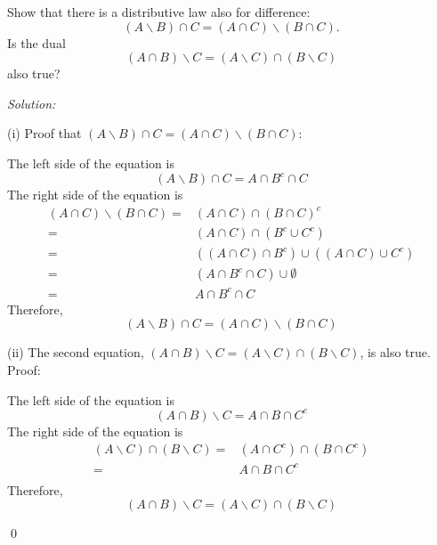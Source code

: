 \documentclass[12pt]{article}
\newenvironment{problem}[2][Problem]{\begin{trivlist}
\item[\hskip \labelsep {\bfseries #1}\hskip \labelsep {\bfseries #2.}]}{\end{trivlist}}
\newenvironment{sol}
    {\emph{Solution:}
    }
    {
    \qed
    }
\begin{document}
\begin{problem}{4}
Show that there is a distributive law also for difference:
$$(A \backslash B) \cap C = (A \cap C) \backslash (B \cap C).$$
Is the dual
$$(A \cap B) \backslash C = (A \backslash C) \cap (B \backslash C)$$
also true?
\end{problem}
\begin{sol}

(i) Proof that $(A \backslash B) \cap C = (A \cap C) \backslash (B \cap C)$:

The left side of the equation is
\[
(A\backslash B)\cap C=A\cap B^c\cap C
\]
The right side of the equation is
\begin{align*}
(A\cap C)\backslash(B\cap C)=&(A\cap C)\cap(B\cap C)^c\\
=&(A\cap C)\cap(B^c\cup C^c)\\
=&((A\cap C)\cap B^c)\cup((A\cap C)\cup C^c)\\
=&(A\cap B^c\cap C)\cup\emptyset\\
=&A\cap B^c\cap C
\end{align*}
Therefore,
\[
(A \backslash B) \cap C = (A \cap C) \backslash (B \cap C)
\]

(ii) The second equation, $(A \cap B) \backslash C = (A \backslash C) \cap (B \backslash C)$, is also true. Proof:

The left side of the equation is
\[
(A\cap B)\backslash C=A\cap B\cap C^c
\]
The right side of the equation is
\begin{align*}
(A\backslash C)\cap(B\backslash C)=&(A\cap C^c)\cap (B\cap C^c)\\
=&A\cap B\cap C^c\\
\end{align*}
Therefore,
\[
(A\cap B)\backslash C=(A\backslash C)\cap(B\backslash C)
\]
\end{sol}
\end{document}
